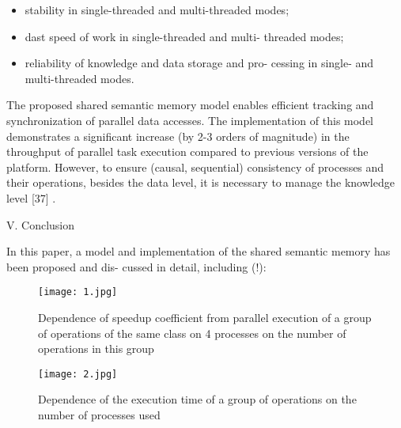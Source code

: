 ﻿\documentclass[a4paper]{article}
\begin{document}
\begin{multicols}{2}
\begin{itemize}
\item stability in single-threaded and multi-threaded
modes;
\item dast speed of work in single-threaded and multi-
threaded modes;
\item reliability of knowledge and data storage and pro-
cessing in single- and multi-threaded modes.
\end{itemize}

The proposed shared semantic memory model enables
efficient tracking and synchronization of parallel data
accesses. The implementation of this model demonstrates
a significant increase (by 2-3 orders of magnitude) in
the throughput of parallel task execution compared to
previous versions of the platform. However, to ensure
(causal, sequential) consistency of processes and their
operations, besides the data level, it is necessary to
manage the knowledge level [37] .
    \begin{center}
        \appendix V. Conclusion
    \end{center} 

In this paper, a model and implementation of the
shared semantic memory has been proposed and dis-
cussed in detail, including (!):




    \begin{figure*}
        
        \texttt{[image: 1.jpg]}
        \caption{Dependence of speedup coefficient from parallel execution of a group of operations of the same class on 4 processes on the number of operations in this group}
        
    \end{figure*}

    \begin{figure*}
        
        \texttt{[image: 2.jpg]}
        \caption{Dependence of the execution time of a group of operations on the number of processes used}
        
    \end{figure*}



\end{multicols}
\end{document}
